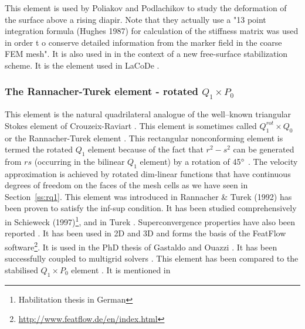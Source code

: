 This element is used by Poliakov and Podlachikov \cite{popo92} to study the deformation of the surface above a rising diapir. Note that they actually use a "13 point integration formula (Hughes
1987) for calculation of the stiffness matrix was used in order
t o conserve detailed information from the marker field in
the coarse FEM mesh". 
It is also used in \cite{anmp15} in the context of a new free-surface stabilization scheme. 
It is the element used in LaCoDe \cite{demh19}.






\subsubsection{The Rannacher-Turek element - rotated $Q_1\times P_0$} \label{ss:RTq1p0}

This element is the natural quadrilateral analogue
of the well–known triangular Stokes element of Crouzeix-Raviart \cite{crra73}.
This element is sometimes called $Q_1^{rot} \times Q_0$ or the Rannacher-Turek element 
\cite[Section 3.6.5]{john16}.
This rectangular nonconforming \cite{crfa89} element is termed the rotated $Q_1$ element 
because of the fact that $r^2-s^2$ can be generated from $rs$ (occurring in the bilinear $Q_1$ 
element) by a rotation of 45$\degree$ \cite[p93]{chen}.
The velocity approximation is achieved by rotated dim-linear functions that have 
continuous degrees of freedom on
the faces of the mesh cells as we have seen in Section~\ref{ss:rq1}.
This element was introduced in Rannacher \& Turek (1992) \cite{ratu92} 
has been proven to satisfy the inf-sup condition. It has been studied comprehensively in Schieweck 
(1997)\footnote{Habilitation thesis in German}, \cite{shzh06} and in Turek \cite{ture94,ture96}.
Superconvergence properties have also been reported \cite{misx06,misx07}.
It has been used in 2D \cite{maky17} and 3D \cite{klll96,gekm08} and forms the basis of the FeatFlow 
software\footnote{\url{http://www.featflow.de/en/index.html}}. 
It is used in the PhD thesis of Gastaldo \cite{gast07} and Ouazzi \cite{ouaz05}.
It has been 
successfully coupled to multigrid solvers \cite{chos98,tuos02}.
This element has been compared to the stabilised $Q_1\times P_0$ element \cite{lisi12}.
It is mentioned in \cite{hans11}

